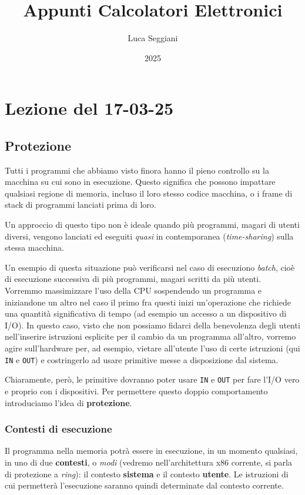 \documentclass[a4paper,11pt]{article}
\title{Appunti Calcolatori Elettronici}
\author{Luca Seggiani}
\date{2025}
\begin{document}
\section{Lezione del 17-03-25}

\thispagestyle{empty}
\pagestyle{fancy}

\subsection{Protezione}
Tutti i programmi che abbiamo visto finora hanno il pieno controllo su la macchina su cui sono in esecuzione.
Questo significa che possono impattare qualsiasi regione di memoria, incluso il loro stesso codice macchina, o i frame di stack di programmi lanciati prima di loro.

Un approccio di questo tipo non è ideale quando più programmi, magari di utenti diversi, vengono lanciati ed eseguiti \textit{quasi} in contemporanea (\textit{time-sharing}) sulla stessa macchina.

Un esempio di questa situazione può verificarsi nel caso di esecuziono \textit{batch}, cioè di esecuzione successiva di più programmi, magari scritti da più utenti.
Vorremmo massimizzare l'uso della CPU sospendendo un programma e iniziandone un altro nel caso il primo fra questi inizi un'operazione che richiede una quantità significativa di tempo (ad esempio un accesso a un dispositivo di I/O).
In questo caso, visto che non possiamo fidarci della benevolenza degli utenti nell'inserire istruzioni esplicite per il cambio da un programma all'altro, vorremo agire sull'hardware per, ad esempio, vietare all'utente l'uso di certe istruzioni (qui \lstinline|IN| e \lstinline|OUT|) e costringerlo ad usare primitive messe a disposizione dal sistema.

Chiaramente, però, le primitive dovranno poter usare \lstinline|IN| e \lstinline|OUT| per fare l'I/O vero e proprio con i dispositivi.
Per permettere questo doppio comportamento introduciamo l'idea di \textbf{protezione}.

\subsubsection{Contesti di esecuzione}
Il programma nella memoria potrà essere in esecuzione, in un momento qualsiasi, in uno di due \textbf{contesti}, o \textit{modi} (vedremo nell'architettura x86 corrente, si parla di protezione a \textit{ring}): il contesto \textbf{sistema} e il contesto \textbf{utente}.
Le istruzioni di cui permetterà l'esecuzione saranno quindi determinate dal contesto corrente.
\end{document}
